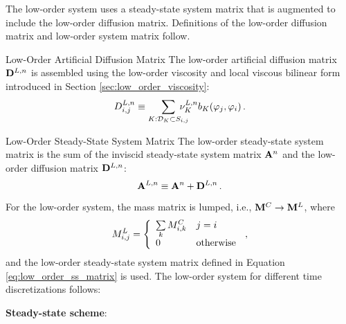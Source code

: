The low-order system uses a steady-state system matrix that is augmented
to include the low-order diffusion matrix. Definitions of the low-order
diffusion matrix and low-order system matrix follow.
\begin{definition}{Low-Order Artificial Diffusion Matrix}
   The low-order artificial diffusion matrix $\loworderdiffusionmatrix[\timeindex]$
   is assembled using the low-order viscosity and local viscous bilinear
   form introduced in Section \ref{sec:low_order_viscosity}:
   \begin{equation}\label{eq:low_order_diffusion_matrix}
     \diffusionmatrixletter\ij^{L,\timeindex} \equiv
       \sumKSij\mkern-20mu\lowordercellviscosity[\timeindex]
       \localviscbilinearform{\cell}{j}{i} \eqp
   \end{equation}
\end{definition}
\begin{definition}{Low-Order Steady-State System Matrix}
   The low-order steady-state system matrix is the sum of the inviscid 
   steady-state system matrix $\ssmatrix[\timeindex]$ and the low-order diffusion
   matrix $\loworderdiffusionmatrix[\timeindex]$:
   \begin{equation}\label{eq:low_order_ss_matrix}
      \loworderssmatrix[\timeindex] \equiv
        \ssmatrix[\timeindex] + \loworderdiffusionmatrix[\timeindex] \eqp
   \end{equation}
\end{definition}
For the low-order system, the mass matrix is lumped, i.e.,
$\mathbf{M}^C\rightarrow\mathbf{M}^L$, where
\begin{equation}
  M^L_{i,j} = \left\{\begin{array}{l l}
    \sum\limits_k M^C_{i,k} & j = i\\
    0                                       & \mbox{otherwise}
    \end{array}\right.
    \,,
\end{equation}
and the low-order
steady-state system matrix defined in Equation \eqref{eq:low_order_ss_matrix}
is used. The low-order system for different time discretizations follows:
\begin{center}{\textbf{Steady-state scheme}:}\end{center}
